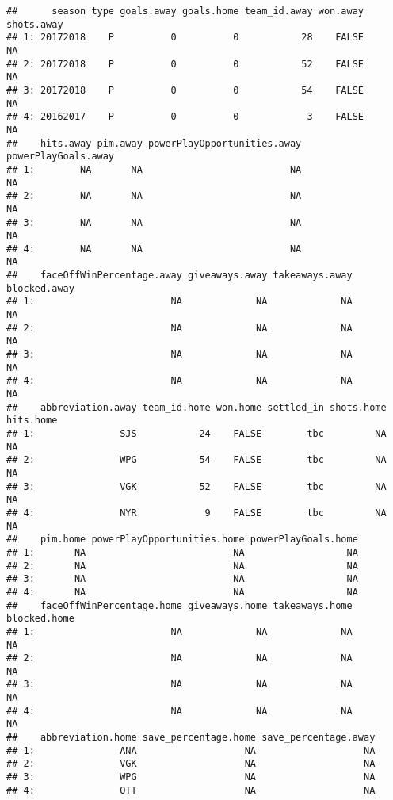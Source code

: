 \documentclass[
]{article}
\begin{document}
\begin{verbatim}
##      season type goals.away goals.home team_id.away won.away shots.away
## 1: 20172018    P          0          0           28    FALSE         NA
## 2: 20172018    P          0          0           52    FALSE         NA
## 3: 20172018    P          0          0           54    FALSE         NA
## 4: 20162017    P          0          0            3    FALSE         NA
##    hits.away pim.away powerPlayOpportunities.away powerPlayGoals.away
## 1:        NA       NA                          NA                  NA
## 2:        NA       NA                          NA                  NA
## 3:        NA       NA                          NA                  NA
## 4:        NA       NA                          NA                  NA
##    faceOffWinPercentage.away giveaways.away takeaways.away blocked.away
## 1:                        NA             NA             NA           NA
## 2:                        NA             NA             NA           NA
## 3:                        NA             NA             NA           NA
## 4:                        NA             NA             NA           NA
##    abbreviation.away team_id.home won.home settled_in shots.home hits.home
## 1:               SJS           24    FALSE        tbc         NA        NA
## 2:               WPG           54    FALSE        tbc         NA        NA
## 3:               VGK           52    FALSE        tbc         NA        NA
## 4:               NYR            9    FALSE        tbc         NA        NA
##    pim.home powerPlayOpportunities.home powerPlayGoals.home
## 1:       NA                          NA                  NA
## 2:       NA                          NA                  NA
## 3:       NA                          NA                  NA
## 4:       NA                          NA                  NA
##    faceOffWinPercentage.home giveaways.home takeaways.home blocked.home
## 1:                        NA             NA             NA           NA
## 2:                        NA             NA             NA           NA
## 3:                        NA             NA             NA           NA
## 4:                        NA             NA             NA           NA
##    abbreviation.home save_percentage.home save_percentage.away
## 1:               ANA                   NA                   NA
## 2:               VGK                   NA                   NA
## 3:               WPG                   NA                   NA
## 4:               OTT                   NA                   NA
\end{verbatim}
\end{document}
